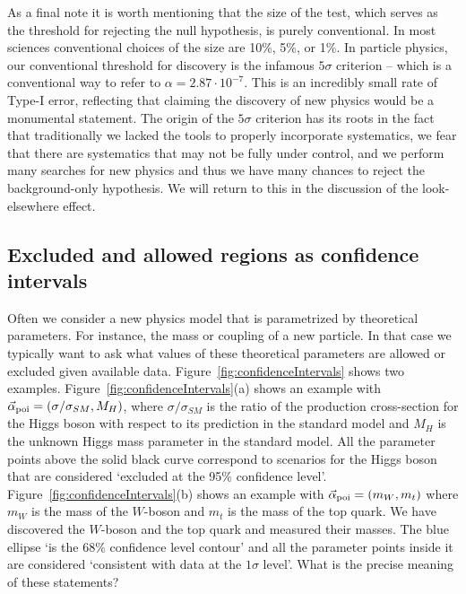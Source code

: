 As a final note it is worth mentioning that the size of the test, which serves as the threshold for rejecting the null hypothesis, is purely conventional.  In most sciences conventional choices of the size are 10\%, 5\%, or 1\%.  In particle physics, our conventional threshold for discovery is the infamous $5\sigma$ criterion -- which is a conventional way to refer to $\alpha=2.87 \cdot 10^{-7}$.  This is an incredibly small rate of Type-I error, reflecting that claiming the discovery of new physics would be a monumental statement.  The origin of the $5\sigma$ criterion has its roots in the fact that traditionally we lacked the tools to properly incorporate systematics, we fear that there are systematics that may not be fully under control, and we perform many searches for new physics and thus we have many chances to reject the background-only hypothesis.  We will return to this in the discussion of the look-elsewhere effect. 


\subsection{Excluded and allowed regions as confidence intervals}


Often we consider a new physics model that is parametrized by theoretical parameters.  For instance, the mass or coupling of a new particle.  In that case we typically want to ask what values of these theoretical parameters are allowed or excluded given available data.  Figure~\ref{fig:confidenceIntervals} shows two examples.  Figure~\ref{fig:confidenceIntervals}(a) shows an example with $\vec\alpha_{\rm poi} = (\sigma/\sigma_{SM}, M_H)$, where $\sigma/\sigma_{SM}$ is the ratio of the production cross-section for the Higgs boson with respect to its prediction in the standard model and $M_H$ is the unknown Higgs mass parameter in the standard model.  All the parameter points above the solid black curve correspond to scenarios for the Higgs boson that are considered `excluded at the 95\% confidence level'.  Figure~\ref{fig:confidenceIntervals}(b) shows an example with 
$\vec\alpha_{\rm poi} = (m_W,m_t)$ where $m_W$ is the mass of the $W$-boson and $m_t$ is the mass of the top quark. We have discovered the $W$-boson and the top quark and measured their masses.  The blue ellipse `is the 68\% confidence level contour' and all the parameter points inside it are considered `consistent with data at the $1\sigma$ level'.   What is the precise meaning of these statements?
